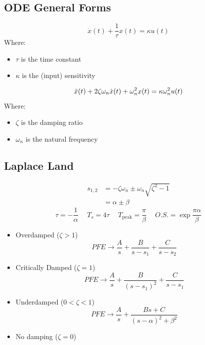 \documentclass[twocolumn, 12pt]{article}
\begin{document}
% 
\subsection*{ODE General Forms}
\begin{equation*}
    \dot{x}(t) +\frac{1}{\tau}x(t) = \kappa u(t)
\end{equation*}
Where:
\begin{itemize}
    \item \(\tau\) is the time constant
    \item \(\kappa\) is the (input) sensitivity
\end{itemize}
\hline
\vspace{8pt}
\begin{equation*}
    \Ddot{x}(t) +2\zeta \omega_n \dot{x}(t) + \omega_n^2x(t) = \kappa \omega_n^2 u(t)
\end{equation*}
Where:
\begin{itemize}
    \item \(\zeta\) is the damping ratio
    \item \(\omega_n\) is the natural frequency
\end{itemize}
\hline


%
\subsection*{Laplace Land}
\begin{align*}
    s_{1,2} &= -\zeta\omega_n \pm \omega_n \sqrt{\zeta^2 -1}\\
            &= \alpha \pm \beta
\end{align*}
\begin{equation*}
    \tau = -\frac{1}{\alpha} \hspace{15pt} T_s =4\tau \hspace{15pt}  T_{\text{peak}} = \frac{\pi}{\beta} \hspace{15pt} O.S. = \exp{\frac{\pi \alpha}{\beta}}
\end{equation*}


\begin{itemize}
    \item Overdamped (\(\zeta > 1\)) 
    \begin{equation*}
        PFE \longrightarrow\frac{A}{s} + \frac{B}{s-s_1} + \frac{C}{s-s_2}
    \end{equation*}
    \item Critically Damped (\(\zeta =1\))
    \begin{equation*}
        PFE \longrightarrow \frac{A}{s} + \frac{B}{(s-s_1)^2} + \frac{C}{s-s_1}
    \end{equation*}
    \item Underdamped (\(0<\zeta <1\))
    \begin{equation*}
        PFE \longrightarrow \frac{A}{s} + \frac{Bs+C}{(s-\alpha)^2+\beta^2}
    \end{equation*}
    \item No damping (\(\zeta =0\))
    \
\end{itemize}
\end{document}
